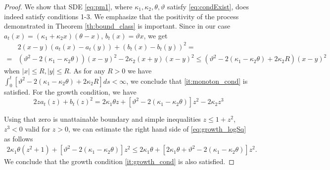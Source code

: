 \documentclass[pdftex,11pt,a4paper] {article}
\begin{document}
\begin{proof}
We show that SDE \eqref{eq:pm1}, where  $\kappa_1, \kappa_2, \theta, \vartheta$ satisfy \eqref{eq:condExist}, does indeed satisfy conditions 1-3. We emphasize that the positivity of the process demonstrated in Theorem \ref{th:bound_class} is important. Since in our case $a_t(x)=(\kappa_1+\kappa_2 x)(\theta-x)$, $b_t(x)=\vartheta x$, we get
\begin{align*}
&2(x-y)(a_t(x)-a_t(y))+(b_t(x)-b_t(y))^2=\\
=&\left(\vartheta^2-2(\kappa_1-\kappa_2\theta)\right)(x-y)^2-2\kappa_2(x+y)(x-y)^2
\le\left(\vartheta^2-2(\kappa_1-\kappa_2\theta)+2\kappa_2R\right)(x-y)^2
\end{align*}
when  $|x|\le R, |y|\le R$. As for any $R>0$ we have $\int_0^t\left[\vartheta^2-2(\kappa_1-\kappa_2\theta)+2\kappa_2R\right]ds<\infty$, we conclude that \ref{it:monoton_cond} is satisfied. For the growth condition, we have
\begin{equation}\label{eq:growth_logSq}
2za_t(z)+b_t(z)^2= 2\kappa_1\theta z+\left[\vartheta^2-2(\kappa_1-\kappa_2\theta)\right]z^2-2\kappa_2z^3
\end{equation}

Using that zero is unattainable boundary and simple inequalities $z\le 1+z^2$, $z^3<0$ 
valid for $z>0$, we can estimate the right hand side of \eqref{eq:growth_logSq} as follows
\begin{equation*}
\begin{split}
2\kappa_1\theta (z^2+1)+\left[\vartheta^2-2(\kappa_1-\kappa_2\theta)\right]z^2\le 
2\kappa_1\theta +\left[2\kappa_1\theta+\vartheta^2-2(\kappa_1-\kappa_2\theta)\right]z^2.
\end{split}
\end{equation*}
We conclude that the growth condition \ref{it:growth_cond} is also satisfied. 
\end{proof}
\end{document}
